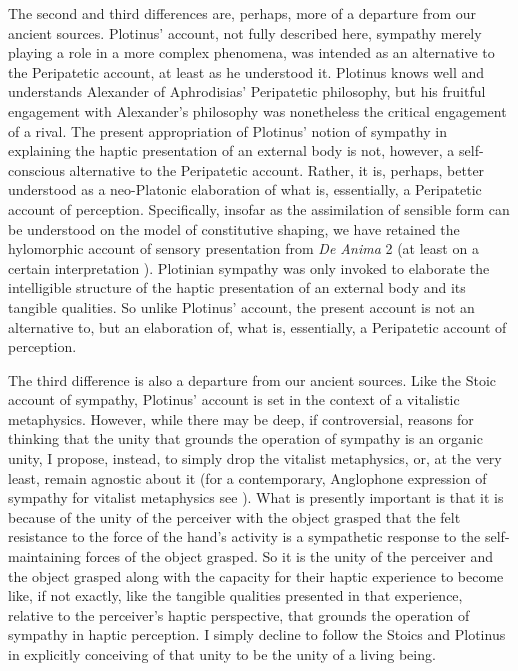 The second and third differences are, perhaps, more of a departure from our ancient sources. Plotinus' account, not fully described here, sympathy merely playing a role in a more complex phenomena, was intended as an alternative to the Peripatetic account, at least as he understood it. Plotinus knows well and understands Alexander of Aphrodisias' Peripatetic philosophy, but his fruitful engagement with Alexander's philosophy was nonetheless the critical engagement of a rival. The present appropriation of Plotinus' notion of sympathy in explaining the haptic presentation of an external body is not, however, a self-conscious alternative to the Peripatetic account. Rather, it is, perhaps, better understood as a neo-Platonic elaboration of what is, essentially, a Peripatetic account of perception. Specifically, insofar as the assimilation of sensible form can be understood on the model of constitutive shaping, we have retained the hylomorphic account of sensory presentation from \emph{De Anima} 2 (at least on a certain interpretation \citealt{Kalderon:2015fr}). Plotinian sympathy was only invoked to elaborate the intelligible structure of the haptic presentation of an external body and its tangible qualities. So unlike Plotinus' account, the present account is not an alternative to, but an elaboration of, what is, essentially, a Peripatetic account of perception.

The third difference is also a departure from our ancient sources. Like the Stoic account of sympathy, Plotinus' account is set in the context of a vitalistic metaphysics. However, while there may be deep, if controversial, reasons for thinking that the unity that grounds the operation of sympathy is an organic unity, I propose, instead, to simply drop the vitalist metaphysics, or, at the very least, remain agnostic about it (for a contemporary, Anglophone expression of sympathy for vitalist metaphysics see \citealt{Nagel:2012as}). What is presently important is that it is because of the unity of the perceiver with the object grasped that the felt resistance to the force of the hand's activity is a sympathetic response to the self-maintaining forces of the object grasped. So it is the unity of the perceiver and the object grasped along with the capacity for their haptic experience to become like, if not exactly, like the tangible qualities presented in that experience, relative to the perceiver's haptic perspective, that grounds the operation of sympathy in haptic perception. I simply decline to follow the Stoics and Plotinus in explicitly conceiving of that unity to be the unity of a living being.

